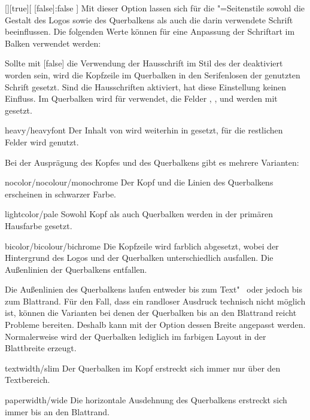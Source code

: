 \begin{Declaration}[v2.03]{[\PSet]}[true][%
  [false]:false%
]
\printdeclarationlist%
%
%
%
%
Mit dieser Option lassen sich für die "=Seitenstile 
sowohl die Gestalt des Logos sowie des Querbalkens als auch die darin 
verwendete Schrift beeinflussen. Die folgenden Werte können für eine Anpassung 
der Schriftart im Balken verwendet werden:
%
\begin{values}
\itemfalse
  Sollte mit [false] die Verwendung der Hausschrift im Stil des 
  \CDs der \TnUD deaktiviert worden sein, wird die Kopfzeile im Querbalken in
  den Serifenlosen der genutzten Schrift gesetzt. Sind die Hausschriften 
  aktiviert, hat diese Einstellung keinen Einfluss.
  Im Querbalken wird  für  verwendet, 
  die Felder , ,  und 
   werden mit  gesetzt.
\item[heavy/heavyfont]
  Der Inhalt von  wird weiterhin in  
  gesetzt, für die restlichen Felder wird  genutzt.
\end{values}
%
Bei der Ausprägung des Kopfes und des Querbalkens gibt es mehrere Varianten:
%
\begin{values}
\item[nocolor/nocolour/monochrome]
  Der Kopf und die Linien des Querbalkens erscheinen in schwarzer Farbe.
\item[lightcolor/pale]
  Sowohl Kopf als auch Querbalken werden in der primären Hausfarbe gesetzt.
\item[bicolor/bicolour/bichrome]
   Die Kopfzeile wird farblich abgesetzt, wobei der 
  Hintergrund des Logos und der Querbalken unterschiedlich ausfallen. Die 
  Außenlinien der Querbalkens entfallen.
\end{values}
%
Die Außenlinien des Querbalkens laufen entweder bis zum Text"~ oder jedoch bis 
zum Blattrand. Für den Fall, dass ein randloser Ausdruck technisch nicht 
möglich ist, können die Varianten bei denen der Querbalken bis an den Blattrand 
reicht Probleme bereiten. Deshalb kann mit der Option  dessen
Breite angepasst werden. Normalerweise wird der Querbalken lediglich im 
farbigen Layout in der Blattbreite erzeugt.
%
\begin{values}
\item[textwidth/slim]
  Der Querbalken im Kopf erstreckt sich immer nur über den Textbereich.
\item[paperwidth/wide]
  Die horizontale Ausdehnung des Querbalkens erstreckt sich immer bis an den 
  Blattrand.
\end{values}
\end{Declaration}

